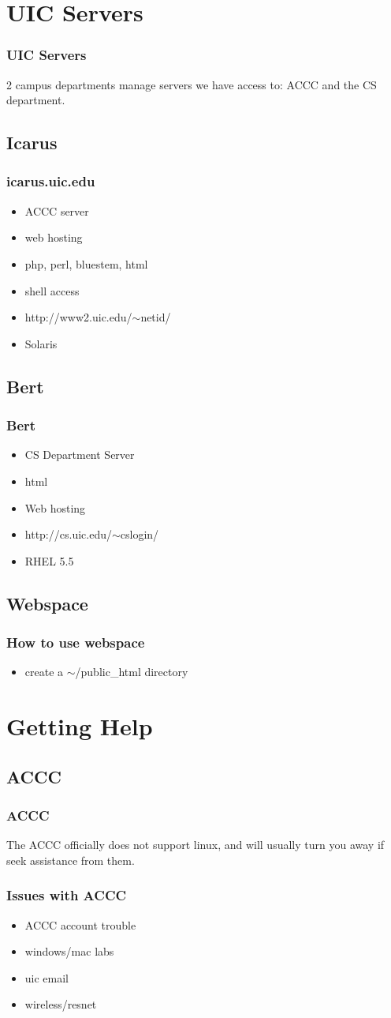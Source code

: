 \documentclass[hyperref={pdfpagelabels=false}]{beamer}
\begin{document}
\section{UIC Servers}
\frame
{
    \frametitle{UIC Servers}
    2 campus departments manage servers we have access to: ACCC and the CS department.
}
\subsection{Icarus}
\frame
{
    \frametitle{icarus.uic.edu}
    \begin{itemize}
    \item{ACCC server}
    \item{web hosting}
    \item{php, perl, bluestem, html}
    \item{shell access}
    \item{http://www2.uic.edu/$\sim$netid/}
    \item{Solaris}
    \end{itemize}
}
\subsection{Bert}
\frame
{
    \frametitle{Bert}
    \begin{itemize}
    \item{CS Department Server}
    \item{html}
    \item{Web hosting}
    \item{http://cs.uic.edu/$\sim$cslogin/}
    \item{RHEL 5.5}
    \end{itemize}
}
\subsection{Webspace}
\frame
{
    \frametitle{How to use webspace}
    \begin{itemize}
    \item{create a $\sim$/public\_html directory}
    \end{itemize}
}
\section{Getting Help}

\subsection{ACCC}
\frame
{
	\frametitle{ACCC}
	The ACCC officially does not support linux, and will usually turn you away if
	seek assistance from them.
}
\frame
{
    \frametitle{Issues with ACCC}
    \begin{itemize}
    \item{ACCC account trouble}
    \item{windows/mac labs}
    \item{uic email}
    \item{wireless/resnet}
    \end{itemize}
}
\end{document}
